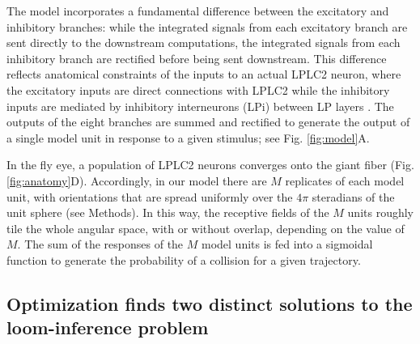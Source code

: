 \documentclass[pdftex,9pt,lineno]{elife}
\begin{document}
The model incorporates a fundamental difference between the excitatory and inhibitory branches: while the integrated signals from each excitatory branch are sent directly to the downstream computations, the integrated signals from each inhibitory branch are rectified before being sent downstream. This difference reflects anatomical constraints of the inputs to an actual LPLC2 neuron, where the excitatory inputs are direct connections with LPLC2 while the inhibitory inputs are mediated by inhibitory interneurons (LPi) between LP layers \citep{mauss2015neural,klapoetke2017ultra}. The outputs of the eight branches are summed and rectified to generate the output of a single model unit in response to a given stimulus; see Fig. \ref{fig:model}A.

In the fly eye, a population of LPLC2 neurons converges onto the giant fiber (Fig. \ref{fig:anatomy}D). Accordingly, in our model there are $M$ replicates of each model unit, with orientations that are spread uniformly over the $4\pi$ steradians of the unit sphere (see Methods). In this way, the receptive fields of the $M$ units roughly  tile the whole angular space, with or without overlap, depending on the value of $M$. The sum of the responses of the $M$ model units is fed into a sigmoidal function to generate the probability of a collision for a given trajectory.



\subsection{Optimization finds two distinct solutions to the loom-inference problem}




\end{document}
